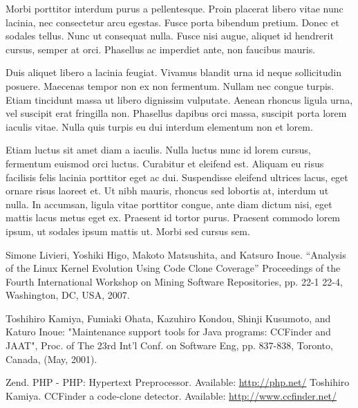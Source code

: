 \documentclass[a4paper,twoside,11pt]{article}
\begin{document}
Morbi porttitor interdum purus a pellentesque. Proin placerat libero vitae nunc lacinia, nec consectetur arcu egestas. Fusce porta bibendum pretium. Donec et sodales tellus. Nunc ut consequat nulla. Fusce nisi augue, aliquet id hendrerit cursus, semper at orci. Phasellus ac imperdiet ante, non faucibus mauris.

Duis aliquet libero a lacinia feugiat. Vivamus blandit urna id neque sollicitudin posuere. Maecenas tempor non ex non fermentum. Nullam nec congue turpis. Etiam tincidunt massa ut libero dignissim vulputate. Aenean rhoncus ligula urna, vel suscipit erat fringilla non. Phasellus dapibus orci massa, suscipit porta lorem iaculis vitae. Nulla quis turpis eu dui interdum elementum non et lorem.

Etiam luctus sit amet diam a iaculis. Nulla luctus nunc id lorem cursus, fermentum euismod orci luctus. Curabitur et eleifend est. Aliquam eu risus facilisis felis lacinia porttitor eget ac dui. Suspendisse eleifend ultrices lacus, eget ornare risus laoreet et. Ut nibh mauris, rhoncus sed lobortis at, interdum ut nulla. In accumsan, ligula vitae porttitor congue, ante diam dictum nisi, eget mattis lacus metus eget ex. Praesent id tortor purus. Praesent commodo lorem ipsum, ut sodales ipsum mattis ut. Morbi sed cursus sem.


\begin{thebibliography}{9}
Simone Livieri, Yoshiki Higo, Makoto Matsushita, and Katsuro Inoue. ``Analysis of the Linux Kernel Evolution Using Code Clone Coverage'' Proceedings of the Fourth International Workshop on Mining Software Repositories,  pp. 22-1 22-4, Washington, DC, USA, 2007.

Toshihiro Kamiya, Fumiaki Ohata, Kazuhiro Kondou, Shinji Kusumoto, and Katuro Inoue: "Maintenance support tools for Java programs: CCFinder and JAAT", Proc. of The 23rd Int'l Conf. on Software Eng, pp. 837-838, Toronto, Canada, (May, 2001).

Zend. PHP - PHP: Hypertext Preprocessor. Available: \url{http://php.net/}
Toshihiro Kamiya. CCFinder a code-clone detector. Available: \url{http://www.ccfinder.net/}

\end{thebibliography}

\newpage
\end{document}
